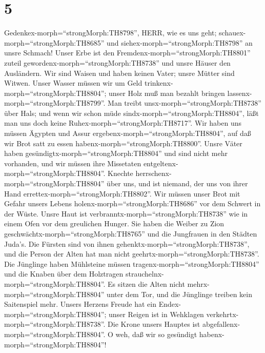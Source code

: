 \hypertarget{section-4}{%
\section{5}\label{section-4}}

 Gedenkex-morph=``strongMorph:TH8798'', HERR, wie es uns
geht; schauex-morph=``strongMorph:TH8685'' und
siehex-morph=``strongMorph:TH8798'' an unsre Schmach!  Unser
Erbe ist den Fremdenx-morph=``strongMorph:TH8801'' zuteil
gewordenx-morph=``strongMorph:TH8738'' und unsre Häuser den Ausländern.
 Wir sind Waisen und haben keinen Vater; unsre Mütter sind
Witwen.  Unser Wasser müssen wir um Geld
trinkenx-morph=``strongMorph:TH8804''; unser Holz muß man bezahlt
bringen lassenx-morph=``strongMorph:TH8799''.  Man treibt
unsx-morph=``strongMorph:TH8738'' über Hals; und wenn wir schon müde
sindx-morph=``strongMorph:TH8804'', läßt man uns doch keine
Ruhex-morph=``strongMorph:TH8717''.  Wir haben uns müssen
Ägypten und Assur ergebenx-morph=``strongMorph:TH8804'', auf daß wir
Brot satt zu essen habenx-morph=``strongMorph:TH8800''. 
Unsre Väter haben gesündigtx-morph=``strongMorph:TH8804'' und sind nicht
mehr vorhanden, und wir müssen ihre Missetaten
entgeltenx-morph=``strongMorph:TH8804''.  Knechte
herrschenx-morph=``strongMorph:TH8804'' über uns, und ist niemand, der
uns von ihrer Hand errettex-morph=``strongMorph:TH8802''. 
Wir müssen unser Brot mit Gefahr unsers Lebens
holenx-morph=``strongMorph:TH8686'' vor dem Schwert in der Wüste.
 Unsre Haut ist verbranntx-morph=``strongMorph:TH8738'' wie
in einem Ofen vor dem greulichen Hunger.  Sie haben die
Weiber zu Zion geschwächtx-morph=``strongMorph:TH8765'' und die
Jungfrauen in den Städten Juda's.  Die Fürsten sind von
ihnen gehenktx-morph=``strongMorph:TH8738'', und die Person der Alten
hat man nicht geehrtx-morph=``strongMorph:TH8738''.  Die
Jünglinge haben Mühlsteine müssen tragenx-morph=``strongMorph:TH8804''
und die Knaben über dem Holztragen
strauchelnx-morph=``strongMorph:TH8804''.  Es sitzen die
Alten nicht mehrx-morph=``strongMorph:TH8804'' unter dem Tor, und die
Jünglinge treiben kein Saitenspiel mehr.  Unsers Herzens
Freude hat ein Endex-morph=``strongMorph:TH8804''; unser Reigen ist in
Wehklagen verkehrtx-morph=``strongMorph:TH8738''.  Die
Krone unsers Hauptes ist abgefallenx-morph=``strongMorph:TH8804''. O
weh, daß wir so gesündigt habenx-morph=``strongMorph:TH8804''!
